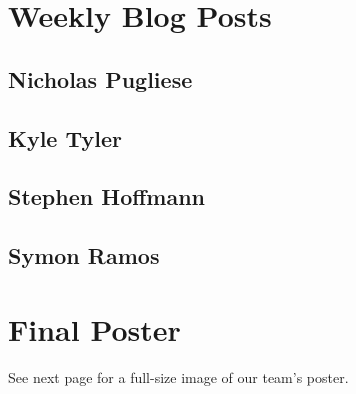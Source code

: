 \documentclass[onecolumn, draftclsnofoot,10pt, compsoc]{IEEEtran}
\begin{document}
\newpage
\section{Weekly Blog Posts}

\subsection{Nicholas Pugliese}



\subsection{Kyle Tyler}



\subsection{Stephen Hoffmann}



\subsection{Symon Ramos}







\newpage
\section{Final Poster}

See next page for a full-size image of our team's poster.
\end{document}
